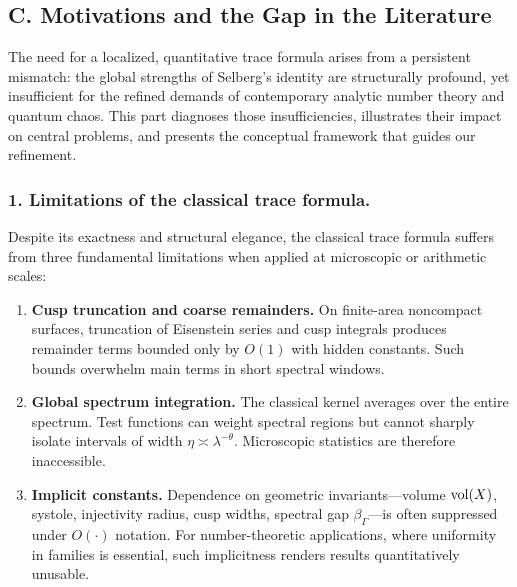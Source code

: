
\subsection*{C. Motivations and the Gap in the Literature}

The need for a localized, quantitative trace formula arises from a persistent
mismatch: the global strengths of Selberg’s identity are structurally profound,
yet insufficient for the refined demands of contemporary analytic number theory
and quantum chaos. This part diagnoses those insufficiencies, illustrates their
impact on central problems, and presents the conceptual framework that guides
our refinement.

\medskip

\subsubsection*{1. Limitations of the classical trace formula.}
Despite its exactness and structural elegance, the classical trace formula
suffers from three fundamental limitations when applied at microscopic or arithmetic scales:

\begin{enumerate}[label=\arabic*.]
  \item \textbf{Cusp truncation and coarse remainders.}
        On finite-area noncompact surfaces, truncation of Eisenstein series and cusp integrals
        produces remainder terms bounded only by $O(1)$ with hidden constants.
        Such bounds overwhelm main terms in short spectral windows.

  \item \textbf{Global spectrum integration.}
        The classical kernel averages over the entire spectrum.
        Test functions can weight spectral regions but cannot sharply isolate intervals of width
        $\eta\asymp\lambda^{-\theta}$.
        Microscopic statistics are therefore inaccessible.

  \item \textbf{Implicit constants.}
        Dependence on geometric invariants—volume $\operatorname{vol}(X)$, systole, injectivity radius,
        cusp widths, spectral gap $\beta_\Gamma$—is often suppressed under $O(\cdot)$ notation.
        For number-theoretic applications, where uniformity in families is essential,
        such implicitness renders results quantitatively unusable.
\end{enumerate}

